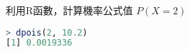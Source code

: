 利用R函數，計算機率公式值 $P(X = 2)$

\begin{lstlisting}[language=R]
> dpois(2, 10.2)
[1] 0.0019336
\end{lstlisting}